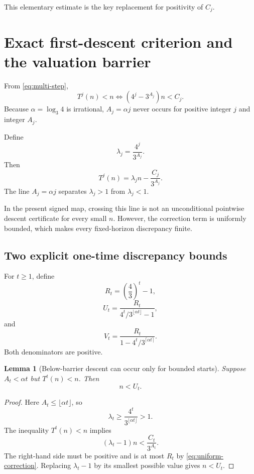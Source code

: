 \documentclass[11pt]{article}
\newtheorem{lemma}[theorem]{Lemma}
\theoremstyle{definition}
\theoremstyle{remark}
\begin{document}
This elementary estimate is the key replacement for positivity of $C_j$.

\section{Exact first-descent criterion and the valuation barrier}

From \eqref{eq:multi-step},
\begin{equation}
T^j(n)<n
\iff
(4^j-3^{A_j})n<C_j.
\label{eq:exact-descent}
\end{equation}
Because $\alpha=\log_3 4$ is irrational, $A_j=\alpha j$ never occurs for positive integer $j$ and integer $A_j$.

Define
\[
\lambda_j=\frac{4^j}{3^{A_j}}.
\]
Then
\[
T^j(n)=\lambda_j n-\frac{C_j}{3^{A_j}}.
\]
The line $A_j=\alpha j$ separates $\lambda_j>1$ from $\lambda_j<1$.

In the present signed map, crossing this line is not an unconditional pointwise descent certificate for every small $n$.  However, the correction term is uniformly bounded, which makes every fixed-horizon discrepancy finite.

\subsection{Two explicit one-time discrepancy bounds}

For $t\ge1$, define
\[
R_t=\left(\frac43\right)^t-1,
\]
\begin{equation}
U_t
=
\frac{R_t}
{4^t/3^{\lfloor\alpha t\rfloor}-1},
\label{eq:Ut}
\end{equation}
and
\begin{equation}
V_t
=
\frac{R_t}
{1-4^t/3^{\lceil\alpha t\rceil}}.
\label{eq:Vt}
\end{equation}
Both denominators are positive.

\begin{lemma}[Below-barrier descent can occur only for bounded starts]
Suppose $A_t<\alpha t$ but $T^t(n)<n$.  Then
\[
n<U_t.
\]
\end{lemma}

\begin{proof}
Here $A_t\le\lfloor\alpha t\rfloor$, so
\[
\lambda_t\ge\frac{4^t}{3^{\lfloor\alpha t\rfloor}}>1.
\]
The inequality $T^t(n)<n$ implies
\[
(\lambda_t-1)n<\frac{C_t}{3^{A_t}}.
\]
The right-hand side must be positive and is at most $R_t$ by \eqref{eq:uniform-correction}.  Replacing $\lambda_t-1$ by its smallest possible value gives $n<U_t$.
\end{proof}
\end{document}
